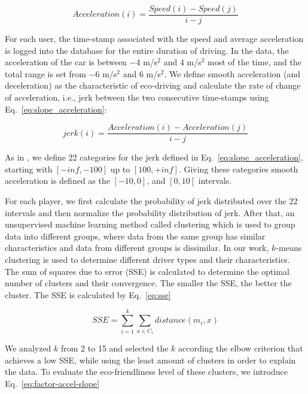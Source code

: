 \documentclass[preprint,authoryear,12pt]{elsarticle}
\begin{document}
\begin{equation}\label{eq:acceleration}
Acceleration(i) = \frac{Speed(i) - Speed(j)}{i-j}
\end{equation}

For each user, the time-stamp associated with the speed and average acceleration is logged into the database for the entire duration of driving. In the data, the acceleration of the car is between $-$4 m/s$^2$ and 4 m/s$^2$ most of the time, and the total range is set from $-$6 m/s$^2$ and 6 m/s$^2$.  We define smooth acceleration (and deceleration) as the characteristic of eco-driving and calculate the rate of change of acceleration, i.e., jerk between the two consecutive time-stamps using Eq.~\ref{eq:slope_acceleration}:

\begin{equation}\label{eq:slope_acceleration}
jerk(i) = \frac{Acceleration(i) - Acceleration(j)}{i-j}
\end{equation}

As in \cite{prendingeroliveira2014}, we define 22 categories for the jerk defined in Eq.~\ref{eq:slope_acceleration},
starting with $[-inf , -100]$ up to $[100, +inf]$. Giving these categories smooth acceleration is defined as the $[-10, 0]$, and $[0, 10]$ intervals.

For each player, we first calculate the probability of jerk distributed over the 22 intervals and then normalize the probability distribution of jerk.
After that, an unsupervised machine learning method called clustering which is used to group data into different groups, where data from the same group has similar characteristics and data from different groups is dissimilar.
In our work, $k$-means clustering is used \citep{KMEAN.1979} to determine different driver types and their characteristics. The sum of squares due to error (SSE) is calculated to determine the optimal number of clusters and their convergence.  The smaller the SSE, the better the cluster. The SSE is calculated by Eq.~\ref{eq:sse}

\begin{equation}\label{eq:sse}
SSE = \sum\limits_{i=1}^{k} \sum\limits_{x \in C_{i}}distance(m_{i},x)
\end{equation}

We analyzed $k$ from 2 to 15 and selected the $k$ according the elbow criterion \cite{Thorndike.1953} that achieves a low SSE, while using the least amount of clusters in order to explain the data. To evaluate the eco-friendliness level of these clusters, we introduce Eq.~\ref{eq:factor-accel-slope}
\end{document}
